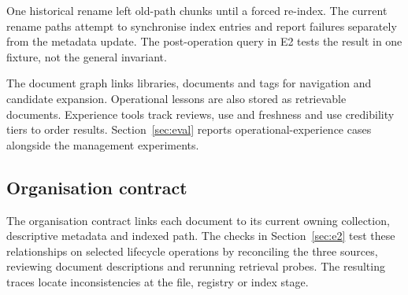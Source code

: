 One historical rename left old-path chunks until a forced re-index. The
current rename paths attempt to synchronise index entries and report
failures separately from the metadata update. The post-operation query in
E2 tests the result in one fixture, not the general invariant.

The document graph links libraries, documents and tags for navigation and
candidate expansion. Operational lessons are also stored as retrievable
documents. Experience tools track reviews, use and freshness and use
credibility tiers to order results. Section~\ref{sec:eval} reports
operational-experience cases alongside the management experiments.

\subsection{Organisation contract}
\label{sec:org-integrity}
\label{sec:org-summary}

The organisation contract links each document to its current owning
collection, descriptive metadata and indexed path. The checks in
Section~\ref{sec:e2} test these relationships on selected lifecycle
operations by reconciling the three sources, reviewing document descriptions
and rerunning retrieval probes. The resulting traces locate inconsistencies
at the file, registry or index stage.
